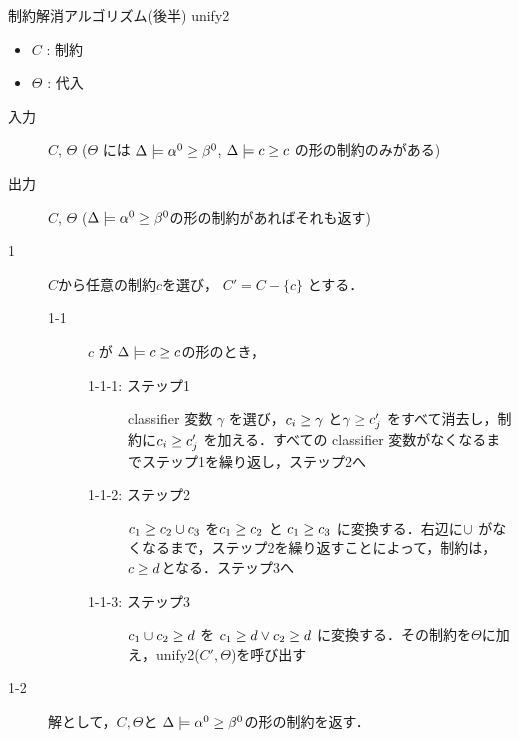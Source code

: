 \begin{oframed}
  制約解消アルゴリズム(後半) unify2
  \begin{itemize}
    \setlength{\itemsep}{-5pt}
  \item $C$ : 制約
  \item $\Theta$ : 代入
  \end{itemize}

  \begin{description}
  \item[入力] $C$, $\Theta$ ($\Theta$ には $\Delta \models {\alpha^0} \ge {\beta^0}$, $\Delta \models {c} \ge {c}$ の形の制約のみがある)
  \item[出力] $C$, $\Theta$ ($\Delta \models {\alpha^0} \ge {\beta^0}$の形の制約があればそれも返す)
  \end{description}

  \begin{description}
  \item[1] $C$から任意の制約$c$を選び， $C' = C - \{c\}$ とする．
    \begin{description}
    \item[1-1] $c$ が $\Delta \models {c} \ge {c}$の形のとき，
      \begin{description}
        \item[1-1-1: ステップ1] classifier 変数 $\gamma$ を選び，${c_i} \ge {\gamma}$ と${\gamma} \ge {c'_j}$ をすべて消去し，制約に${c_i} \ge {c'_j}$ を加える．すべての classifier 変数がなくなるまでステップ1を繰り返し，ステップ2へ
        \item[1-1-2: ステップ2] ${c_1} \ge {c_2 \cup c_3}$ を${c_1} \ge {c_2}$ と ${c_1} \ge {c_3}$ に変換する．右辺に$\cup$ がなくなるまで，ステップ2を繰り返すことによって，制約は， ${c} \ge {d}$となる．ステップ3へ
        \item[1-1-3: ステップ3] ${c_1 \cup c_2} \ge {d}$ を ${c_1} \ge {d} \vee {c_2} \ge {d}$ に変換する．その制約を$\Theta$に加え，unify2($C', \Theta$)を呼び出す
      \end{description}
    \end{description}
    \item[1-2] 解として，$C, \Theta$と $\Delta \models {\alpha^0} \ge {\beta^0}$の形の制約を返す．
  \end{description}
\end{oframed}

